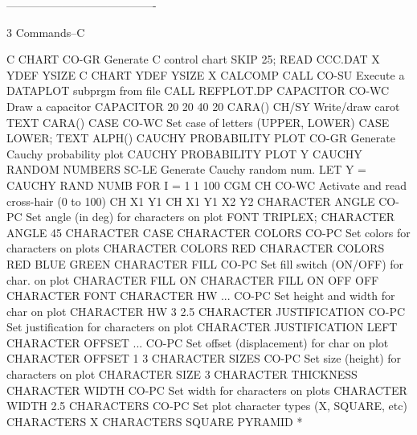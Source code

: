 ----------------------------------------
 
3
Commands--C
 
C CHART                     CO-GR Generate C control chart
                                  SKIP 25; READ CCC.DAT X YDEF YSIZE
                                  C CHART YDEF YSIZE X
CALCOMP
CALL                        CO-SU Execute a DATAPLOT subprgm from file
                                  CALL REFPLOT.DP
CAPACITOR                   CO-WC Draw a capacitor
                                  CAPACITOR 20 20 40 20
CARA()                      CH/SY Write/draw carot
                                  TEXT CARA()
CASE                        CO-WC Set case of letters (UPPER, LOWER)
                                  CASE LOWER; TEXT ALPH()
CAUCHY PROBABILITY PLOT     CO-GR Generate Cauchy probability plot
                                  CAUCHY PROBABILITY PLOT Y
CAUCHY RANDOM NUMBERS       SC-LE Generate Cauchy random num.
                                  LET Y = CAUCHY RAND NUMB FOR I = 1 1 100
CGM
CH                          CO-WC Activate and read cross-hair (0 to 100)
                                  CH X1 Y1
                                  CH X1 Y1 X2 Y2
CHARACTER ANGLE             CO-PC Set angle (in deg) for characters on plot
                                  FONT TRIPLEX; CHARACTER ANGLE 45
CHARACTER CASE
CHARACTER COLORS            CO-PC Set colors for characters on plots
                                  CHARACTER COLORS RED
                                  CHARACTER COLORS RED BLUE GREEN
CHARACTER FILL              CO-PC Set fill switch (ON/OFF) for char. on plot
                                  CHARACTER FILL ON
                                  CHARACTER FILL ON OFF OFF
CHARACTER FONT
CHARACTER HW ...            CO-PC Set height and width for char on plot
                                  CHARACTER HW 3 2.5
CHARACTER JUSTIFICATION     CO-PC Set justification for characters on plot
                                  CHARACTER JUSTIFICATION LEFT
CHARACTER OFFSET ...        CO-PC Set offset (displacement) for char on plot
                                  CHARACTER OFFSET 1 3
CHARACTER SIZES             CO-PC Set size (height) for characters on plot
                                  CHARACTER SIZE 3
CHARACTER THICKNESS
CHARACTER WIDTH             CO-PC Set width for characters on plots
                                  CHARACTER WIDTH 2.5
CHARACTERS                  CO-PC Set plot character types (X, SQUARE, etc)
                                  CHARACTERS X
                                  CHARACTERS SQUARE PYRAMID *
